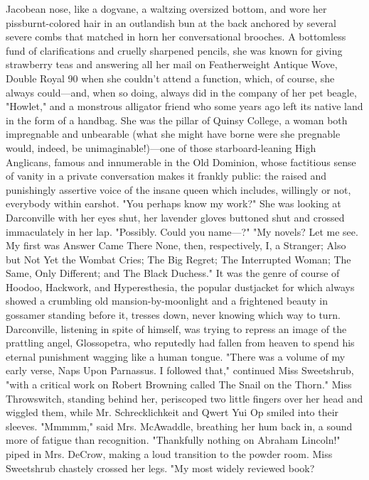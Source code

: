 Jacobean nose, like a dogvane, a waltzing oversized bottom, and wore her
pissburnt-colored hair in an outlandish bun at the back anchored by several
severe combs that matched in horn her conversational brooches. A bottomless fund
of clarifications and cruelly sharpened pencils, she was known for giving
strawberry teas and answering all her mail on Featherweight Antique Wove, Double
Royal 90 when she couldn't attend a function, which, of course, she always
could---and, when so doing, always did in the company of her pet beagle, "Howlet,"
and a monstrous alligator friend who some years ago left its native land in the
form of a handbag. She was the pillar of Quinsy College, a woman both
impregnable and unbearable (what she might have borne were she pregnable would,
indeed, be unimaginable!)---one of those starboard-leaning High Anglicans, famous
and innumerable in the Old Dominion, whose factitious sense of vanity in a
private conversation makes it frankly public: the raised and punishingly
assertive voice of the insane queen which includes, willingly or not, everybody
within earshot.
  "You perhaps know my work?"
  She was looking at Darconville with her eyes shut, her lavender gloves
buttoned shut and crossed immaculately in her lap.
  "Possibly. Could you name---?"
  "My novels? Let me see. My first was Answer Came There None, then,
respectively, I, a Stranger; Also but Not Yet the Wombat Cries; The Big Regret;
The Interrupted Woman; The Same, Only Different; and The Black Duchess." It was
the genre of course of Hoodoo, Hackwork, and Hyperesthesia, the popular
dustjacket for which always showed a crumbling old mansion-by-moonlight and a
frightened beauty in gossamer standing before it, tresses down, never knowing
which way to turn.
  Darconville, listening in spite of himself, was trying to repress an image of
the prattling angel, Glossopetra, who reputedly had fallen from heaven to spend
his eternal punishment wagging like a human tongue.
  "There was a volume of my early verse, Naps Upon Parnassus. I followed that,"
continued Miss Sweetshrub, "with a critical work on Robert Browning called The
Snail on the Thorn." Miss Throwswitch, standing behind her, periscoped two
little fingers over her head and wiggled them, while Mr. Schrecklichkeit and
Qwert Yui Op smiled into their sleeves.
  "Mmmmm," said Mrs. McAwaddle, breathing her hum back in, a sound more of
fatigue than recognition.
  "Thankfully nothing on Abraham Lincoln!" piped in Mrs. DeCrow, making a loud
transition to the powder room.
  Miss Sweetshrub chastely crossed her legs. "My most widely reviewed book?
